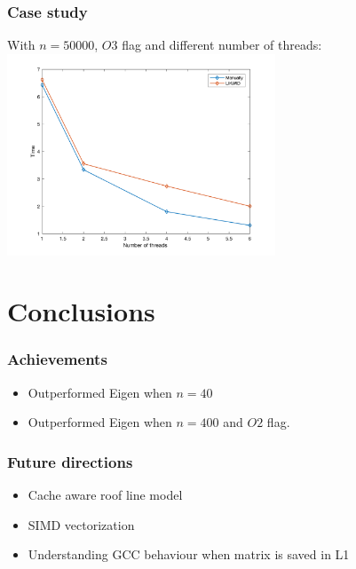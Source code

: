 \documentclass{beamer}
\begin{document}
\begin{frame}
\frametitle{Case study}
With $n = 50000$, $O3$ flag and different number of threads: 
\includegraphics[width=8cm, height=6cm]{graficotimes}
\end{frame}

\section{Conclusions}

\begin{frame}
\frametitle{Achievements}
\begin{itemize}
 \item Outperformed Eigen when $n = 40$
 \item Outperformed Eigen when $n = 400$ and $O2$ flag.
\end{itemize}
 \end{frame}
 
\begin{frame}
\frametitle{Future directions}

\begin{itemize}
 \item Cache aware roof line model
 \item SIMD vectorization
 \item Understanding GCC behaviour when matrix is saved in L1
\end{itemize}
\end{frame}
\end{document}
